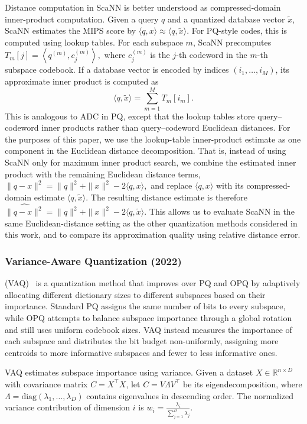 \documentclass[sigconf]{acmart}
\begin{document}
Distance computation in ScaNN is better understood as compressed-domain inner-product computation. 
Given a query $q$ and a quantized database vector $\tilde{x}$, ScaNN estimates the MIPS score by
\(
\langle q,x\rangle
\approx
\langle q,\tilde{x}\rangle .
\)
For PQ-style codes, this is computed using lookup tables. 
For each subspace $m$, ScaNN precomputes
\(
T_m[j]
=
\left\langle q^{(m)}, c_j^{(m)} \right\rangle ,
\)
where $c_j^{(m)}$ is the $j$-th codeword in the $m$-th subspace codebook. 
If a database vector is encoded by indices $(i_1,\ldots,i_M)$, its approximate inner product is computed as
\[
\langle q,\tilde{x}\rangle
=
\sum_{m=1}^{M}
T_m[i_m].
\]
This is analogous to ADC in PQ, except that the lookup tables store query--codeword inner products rather than query--codeword Euclidean distances. 
For the purposes of this paper, we use the lookup-table inner-product estimate as one component in the Euclidean distance decomposition. 
That is, instead of using ScaNN only for maximum inner product search, we combine the estimated inner product with the remaining Euclidean distance terms,
\(
\|q-x\|^2
=
\|q\|^2+\|x\|^2-2\langle q,x\rangle,
\)
and replace \(\langle q,x\rangle\) with its compressed-domain estimate \(\langle q,\tilde{x}\rangle\). 
The resulting distance estimate is therefore
\(
\widehat{\|q-x\|^2}
=
\|q\|^2+\|x\|^2-2\langle q,\tilde{x}\rangle .
\)
This allows us to evaluate ScaNN in the same Euclidean-distance setting as the other quantization methods considered in this work, and to compare its approximation quality using relative distance error.

\subsubsection{\textbf{Variance-Aware Quantization (2022)}} (VAQ)~\cite{vaq} is a quantization method that improves over PQ and OPQ by adaptively allocating different dictionary sizes to different subspaces based on their importance. 
Standard PQ assigns the same number of bits to every subspace, while OPQ attempts to balance subspace importance through a global rotation and still uses uniform codebook sizes. 
VAQ instead measures the importance of each subspace and distributes the bit budget non-uniformly, assigning more centroids to more informative subspaces and fewer to less informative ones.

VAQ estimates subspace importance using variance. 
Given a dataset $X \in \mathbb{R}^{n \times D}$ with covariance matrix $C = X^\top X$, let \( C = V \Lambda V^\top \)
be its eigendecomposition, where $\Lambda = \mathrm{diag}(\lambda_1,\ldots,\lambda_D)$ contains eigenvalues in descending order. 
The normalized variance contribution of dimension $i$ is
\(
w_i = \frac{\lambda_i}{\sum_{j=1}^{D} \lambda_j}.
\)
\end{document}
